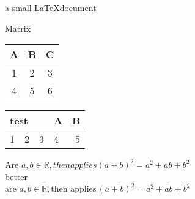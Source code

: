 \documentclass[12pt,twoside,a4paper]{article}
\begin{document}
 
a small \LaTeX document 

Matrix
\begin{tabular}{|c|c|c|} 

\hline 
A & B & C \\ 
\hline 
1 & 2 & 3 \\ 
\hline 
4 & 5 & 6 
\\ 
\hline 
\end{tabular} 


\begin{tabular}{|c|c|c|l|r|} 
\hline 
\multicolumn{3}{|l|}{test} & A & B \\ 
\hline 
1 & 2 & 3 & 4 & 5 \\ 
\hline 
\end{tabular} 


\noindent
Are $a, b \in \mathbb{R}, then applies (a+b)^{2} = a^{2} + ab + b^{2} $ \\ 
better \\ 
are $a, b \in \mathbb{R}, \textrm{then applies} \, (a+b)^{2 } = a^{2 } + ab + b^{2}$\\ 
\end{document}
